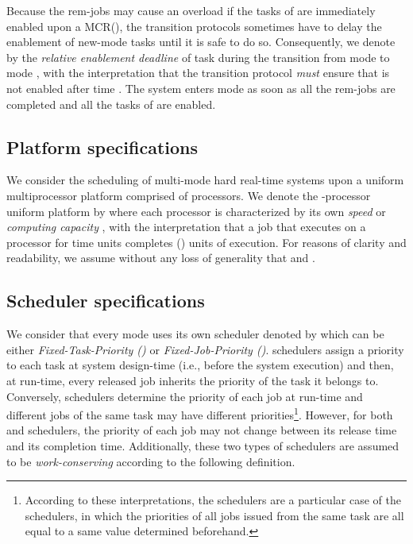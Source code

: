 \documentclass[10pt,english,a4paper]{article}
\newtheorem{validity test}{Validity Test}
\begin{document}
Because the rem-jobs may cause an overload if the tasks of  are immediately enabled upon a MCR(), the transition protocols sometimes have to delay the enablement of new-mode tasks until it is safe to do so. Consequently, we denote by  the {\em relative enablement deadline} of task  during the transition from mode  to mode , with the interpretation that the transition protocol {\em must} ensure that  is not enabled after time . The system enters mode  as soon as all the rem-jobs are completed and all the tasks of  are enabled.

\subsection{Platform specifications}

We consider the scheduling of multi-mode hard real-time systems upon a uniform multiprocessor platform comprised of  processors. We denote the -processor uniform platform by  where each processor  is characterized by its own {\em speed} or {\em computing capacity} , with the interpretation that a job that executes on a processor  for  time units completes () units of execution. For reasons of clarity and readability, we assume without any loss of generality that  and .

\subsection{Scheduler specifications}
\label{sec:scheduler_specs}

We consider that every mode  uses its own scheduler denoted by  which can be either {\em Fixed-Task-Priority ()} or {\em Fixed-Job-Priority ()}.  schedulers assign a priority to each task at system design-time (i.e., before the system execution) and then, at run-time, every released job inherits the priority of the task it belongs to. Conversely,  schedulers determine the priority of each job at run-time and different jobs of the same task may have different priorities\footnote{According to these interpretations, the  schedulers are a particular case of the  schedulers, in which the priorities of all jobs issued from the same task are all equal to a same value determined beforehand.}. However, for both  and  schedulers, the priority of each job may not change between its release time and its completion time. Additionally, these two types of schedulers are assumed to be \emph{work-conserving} according to the following definition.
 
\end{document}
